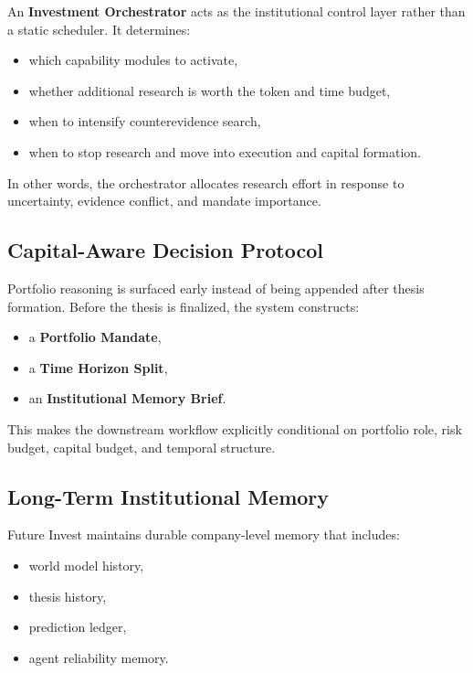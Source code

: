 \documentclass[11pt]{article}
\begin{document}
An \textbf{Investment Orchestrator} acts as the institutional control layer rather than a static scheduler. It determines:

\begin{itemize}
\item which capability modules to activate,
\item whether additional research is worth the token and time budget,
\item when to intensify counterevidence search,
\item when to stop research and move into execution and capital formation.
\end{itemize}

In other words, the orchestrator allocates research effort in response to uncertainty, evidence conflict, and mandate importance.

\subsection{Capital-Aware Decision Protocol}

Portfolio reasoning is surfaced early instead of being appended after thesis formation. Before the thesis is finalized, the system constructs:

\begin{itemize}
\item a \textbf{Portfolio Mandate},
\item a \textbf{Time Horizon Split},
\item an \textbf{Institutional Memory Brief}.
\end{itemize}

This makes the downstream workflow explicitly conditional on portfolio role, risk budget, capital budget, and temporal structure.

\subsection{Long-Term Institutional Memory}

Future Invest maintains durable company-level memory that includes:

\begin{itemize}
\item world model history,
\item thesis history,
\item prediction ledger,
\item agent reliability memory.
\end{itemize}
\end{document}
